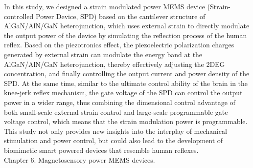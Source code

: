 \noindent In this study, we designed a strain  modulated  power MEMS device  (Strain-controlled Power Device, SPD) based on the cantilever structure  of  AlGaN/AlN/GaN heterojunction, which uses external strain  to directly modulate  the output power  of the device by simulating the reflection process of the human reflex. Based on the piezotronics  effect, the piezoelectric polarization charges  generated by external strain can modulate the energy band  at the AlGaN/AlN/GaN heterojunction, thereby effectively adjusting the  2DEG concentration, and finally controlling the output current  and power density of the SPD. At the same time, similar to the ultimate control ability of the brain in the knee-jerk reflex mechanism, the gate voltage  of the SPD  can control the output power  in a wider range, thus combining the dimensional control advantage of both small-scale external strain  control and large-scale programmable gate voltage  control, which means that the strain  modulation  power is programmable. This study not only provides new insights into the interplay of mechanical stimulation and power control, but could also lead to the development of biomimetic smart powered devices that resemble human reflexes.\\

\noindent Chapter 6. Magnetosensory power MEMS devices.\\

